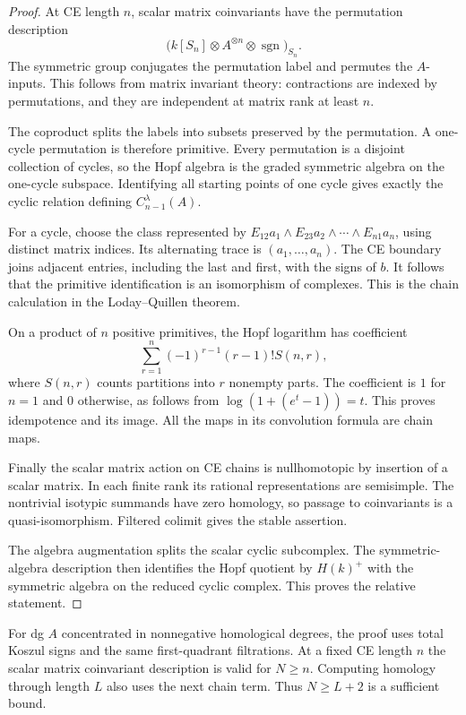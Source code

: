 \begin{proof}
At CE length $n$, scalar matrix coinvariants have the
permutation description
\[
 \bigl(k[S_n]\otimes A^{\otimes n}\otimes\operatorname{sgn}
                                           \bigr)_{S_n}.
\]
The symmetric group conjugates the permutation label and
permutes the $A$-inputs. This follows from matrix invariant
theory: contractions are indexed by permutations, and they
are independent at matrix rank at least $n$.

The coproduct splits the labels into subsets preserved by
the permutation. A one-cycle permutation is therefore
primitive. Every permutation is a disjoint collection of
cycles, so the Hopf algebra is the graded symmetric algebra
on the one-cycle subspace. Identifying all starting points
of one cycle gives exactly the cyclic relation defining
$C^\lambda_{n-1}(A)$.

For a cycle, choose the class represented by
$E_{12}a_1\wedge E_{23}a_2\wedge\cdots\wedge E_{n1}a_n$,
using distinct matrix indices. Its alternating trace is
$(a_1,\ldots,a_n)$. The CE boundary joins adjacent entries,
including the last and first, with the signs of $b$.
It follows that the primitive identification is an
isomorphism of complexes. This is the chain calculation in
the Loday--Quillen theorem.

On a product of $n$ positive primitives, the Hopf logarithm
has coefficient
\[
 \sum_{r=1}^n(-1)^{r-1}(r-1)!S(n,r),
\]
where $S(n,r)$ counts partitions into $r$ nonempty parts.
The coefficient is $1$ for $n=1$ and $0$ otherwise, as follows
from $\log(1+(e^t-1))=t$. This proves idempotence and its
image. All the maps in its convolution formula are chain
maps.

Finally the scalar matrix action on CE chains is nullhomotopic
by insertion of a scalar matrix. In each finite rank its
rational representations are semisimple. The nontrivial
isotypic summands have zero homology, so passage to
coinvariants is a quasi-isomorphism. Filtered colimit gives
the stable assertion. 

The algebra augmentation splits the
scalar cyclic subcomplex. The symmetric-algebra description
then identifies the Hopf quotient by $H(k)^+$ with the symmetric
algebra on the reduced cyclic complex. This proves the relative
statement.
\end{proof}

For dg $A$ concentrated in nonnegative homological degrees,
the proof uses total Koszul signs and the same first-quadrant
filtrations. At a fixed CE length $n$ the scalar matrix
coinvariant description is valid for $N\geq n$. Computing
homology through length $L$ also uses the next chain term.
Thus $N\geq L+2$ is a sufficient bound. 

